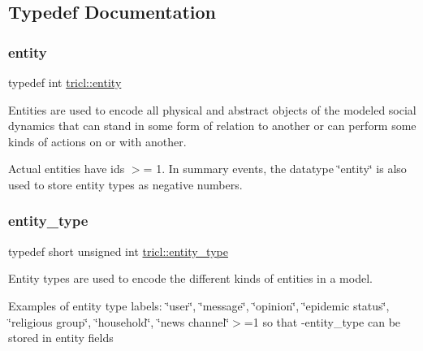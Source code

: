 \subsection{Typedef Documentation}
\mbox{\label{namespacetricl_a57273122278e8b301844e2a2e1f0742f}} 
\subsubsection{\texorpdfstring{entity}{entity}}
{\footnotesize\ttfamily typedef int \hyperlink{namespacetricl_a57273122278e8b301844e2a2e1f0742f}{tricl\+::entity}}



Entities are used to encode all physical and abstract objects of the modeled social dynamics that can stand in some form of relation to another or can perform some kinds of actions on or with another. 

Actual entities have ids $>$= 1. In summary events, the datatype \char`\"{}entity\char`\"{} is also used to store entity types as negative numbers. \mbox{\label{namespacetricl_afd4de3aedd5e48cf955f03457386e98f}} 
\subsubsection{\texorpdfstring{entity\+\_\+type}{entity\_type}}
{\footnotesize\ttfamily typedef short unsigned int \hyperlink{namespacetricl_afd4de3aedd5e48cf955f03457386e98f}{tricl\+::entity\+\_\+type}}



Entity types are used to encode the different kinds of entities in a model. 

Examples of entity type labels\+: \char`\"{}user\char`\"{}, \char`\"{}message\char`\"{}, \char`\"{}opinion\char`\"{}, \char`\"{}epidemic status\char`\"{}, \char`\"{}religious group\char`\"{}, \char`\"{}household\char`\"{}, \char`\"{}news channel\char`\"{}$>$=1 so that -\/entity\+\_\+type can be stored in entity fields \mbox{\label{namespacetricl_a2d01894944fb58a8fedc0912a48d13f8}} 
